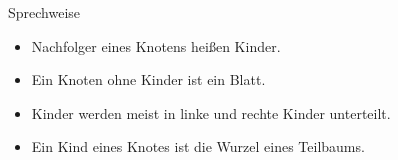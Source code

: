 \begin{frame}
\frametitle{\insertsection}
\begin{block}
{Sprechweise}
\begin{itemize}
	\item Nachfolger eines Knotens heißen \alert{Kinder}.
	\item Ein Knoten ohne Kinder ist ein \alert{Blatt}.
	\item Kinder werden meist in \alert{linke} und \alert{rechte} Kinder unterteilt.
	\item Ein Kind eines Knotes ist die Wurzel eines \alert{Teilbaums}.
\end{itemize}
\end{block}
\end{frame}